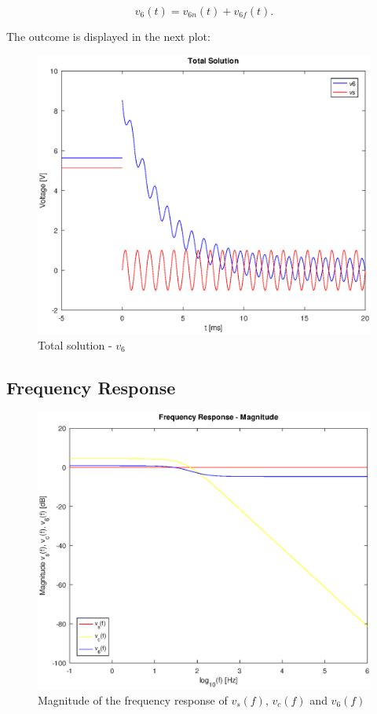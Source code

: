 \begin{equation}
  v_6(t) = v_{6n}(t) + v_{6f}(t).
  \label{eq:v6_sol}
\end{equation}

The outcome is displayed in the next plot:

\begin{figure}[H] \centering
\includegraphics[width=0.8\linewidth]{tot_sol.eps}
\caption{Total solution - $v_6$}
\label{fig:total solution}
\end{figure}


\newpage
\subsection{Frequency Response}
\label{subsec:frequency_response}

\begin{figure}[H] \centering
\includegraphics[width=0.8\linewidth]{freq_db.eps}
\caption{Magnitude of the frequency response of $v_s(f)$, $v_c(f)$ and $v_6(f)$}
\label{fig:magnitude_theo}
\end{figure}

